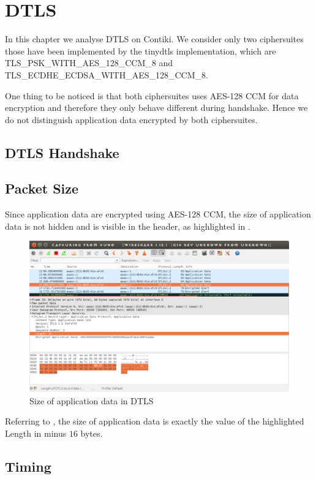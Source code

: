 \chapter{DTLS} \label{Chp: DTLS}

In this chapter we analyse DTLS on Contiki. We consider only two ciphersuites those have been implemented by the tinydtls implementation, which are TLS\_PSK\_WITH\_AES\_128\_CCM\_8 and TLS\_ECDHE\_ECDSA\_WITH\_AES\_128\_CCM\_8. 

One thing to be noticed is that both ciphersuites uses AES-128 CCM for data encryption and therefore they only behave different during handshake. Hence we do not distinguish application data encrypted by both ciphersuites.

\section{DTLS Handshake}

\section{Packet Size}

Since application data are encrypted using AES-128 CCM, the size of application data is not hidden and is visible in the header, as highlighted in .

\begin{figure}[ht!]
	\center
	\includegraphics[width=.7\textwidth]{fig/dtlslength.png}
	\caption{Size of application data in DTLS}
	\label{Fig: Size of application data in DTLS}
\end{figure}

Referring to \cite{rfc5116}, the size of application data is exactly the value of the highlighted Length in  minus $16$ bytes.


\section{Timing}

